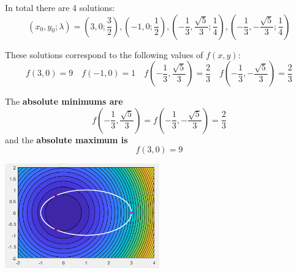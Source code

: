 \documentclass{article}
\begin{document}
\begin{itemize}
In total there are 4 solutions:
\[(x_0, y_0; \lambda) = (3, 0; \frac{3}{2}), (-1, 0; \frac{1}{2}), (-\frac{1}{3}, \frac{\sqrt{5}}{3}; \frac{1}{4}), (-\frac{1}{3}, -\frac{\sqrt{5}}{3}; \frac{1}{4})\] 

These solutions correspond to the following values of \(f(x,y)\):
\[f(3, 0) = 9 \quad f(-1, 0) = 1 \quad f(-\frac{1}{3}, \frac{\sqrt{5}}{3}) = \frac{2}{3} \quad f(-\frac{1}{3}, -\frac{\sqrt{5}}{3}) = \frac{2}{3} \]

The {\bf absolute minimums are}
\[f(-\frac{1}{3}, \frac{\sqrt{5}}{3}) = f(-\frac{1}{3}, -\frac{\sqrt{5}}{3}) = \frac{2}{3}\]
and the {\bf absolute maximum is}
\[f(3, 0) = 9\]

\begin{center}
\includegraphics[width = 0.5\textwidth]{lagrange_3.png}
\end{center}



\end{itemize}
\end{document}
